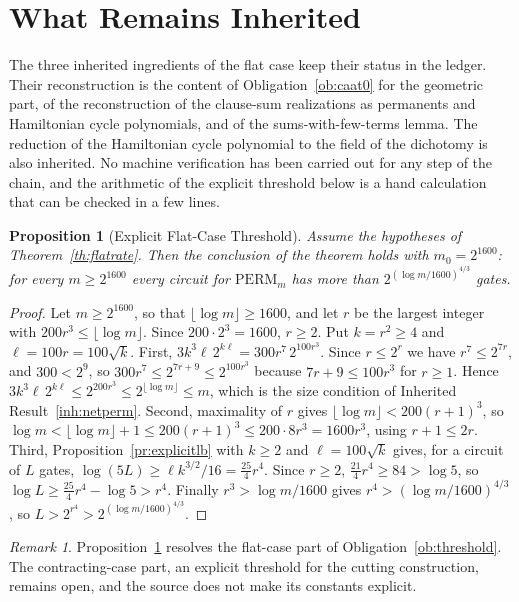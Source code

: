 \documentclass[11pt,letterpaper]{report}
\theoremstyle{plain}
\newtheorem{proposition}[theorem]{Proposition}
\theoremstyle{definition}
\theoremstyle{remark}
\newtheorem{remark}[theorem]{Remark}
\begin{document}
\section{What Remains Inherited}

The three inherited ingredients of the flat case keep their status in the ledger. Their reconstruction is the content of Obligation~\ref{ob:caat0} for the geometric part, of the reconstruction of the clause-sum realizations as permanents and Hamiltonian cycle polynomials, and of the sums-with-few-terms lemma. The reduction of the Hamiltonian cycle polynomial to the field of the dichotomy is also inherited. No machine verification has been carried out for any step of the chain, and the arithmetic of the explicit threshold below is a hand calculation that can be checked in a few lines.

\begin{proposition}[Explicit Flat-Case Threshold]\label{pr:flatm0}
Assume the hypotheses of Theorem~\ref{th:flatrate}. Then the conclusion of the theorem holds with $m_0=2^{1600}$: for every $m\ge2^{1600}$ every circuit for $\mathrm{PERM}_m$ has more than $2^{(\log m/1600)^{4/3}}$ gates.
\end{proposition}
\begin{proof}
Let $m\ge2^{1600}$, so that $\lfloor\log m\rfloor\ge1600$, and let $r$ be the largest integer with $200r^3\le\lfloor\log m\rfloor$. Since $200\cdot2^3=1600$, $r\ge2$. Put $k=r^2\ge4$ and $\ell=100r=100\sqrt k$. First, $3k^3\ell\,2^{k\ell}=300r^7\,2^{100r^3}$. Since $r\le2^r$ we have $r^7\le2^{7r}$, and $300<2^9$, so $300r^7\le2^{7r+9}\le2^{100r^3}$ because $7r+9\le100r^3$ for $r\ge1$. Hence $3k^3\ell\,2^{k\ell}\le2^{200r^3}\le2^{\lfloor\log m\rfloor}\le m$, which is the size condition of Inherited Result~\ref{inh:netperm}. Second, maximality of $r$ gives $\lfloor\log m\rfloor<200(r+1)^3$, so $\log m<\lfloor\log m\rfloor+1\le200(r+1)^3\le200\cdot8r^3=1600r^3$, using $r+1\le2r$. Third, Proposition~\ref{pr:explicitlb} with $k\ge2$ and $\ell=100\sqrt k$ gives, for a circuit of $L$ gates, $\log(5L)\ge\ell k^{3/2}/16=\tfrac{25}4r^4$. Since $r\ge2$, $\tfrac{21}4r^4\ge84>\log5$, so $\log L\ge\tfrac{25}4r^4-\log5>r^4$. Finally $r^3>\log m/1600$ gives $r^4>(\log m/1600)^{4/3}$, so $L>2^{r^4}>2^{(\log m/1600)^{4/3}}$.
\end{proof}

\begin{remark}
Proposition~\ref{pr:flatm0} resolves the flat-case part of Obligation~\ref{ob:threshold}. The contracting-case part, an explicit threshold for the cutting construction, remains open, and the source does not make its constants explicit.
\end{remark}
\end{document}
